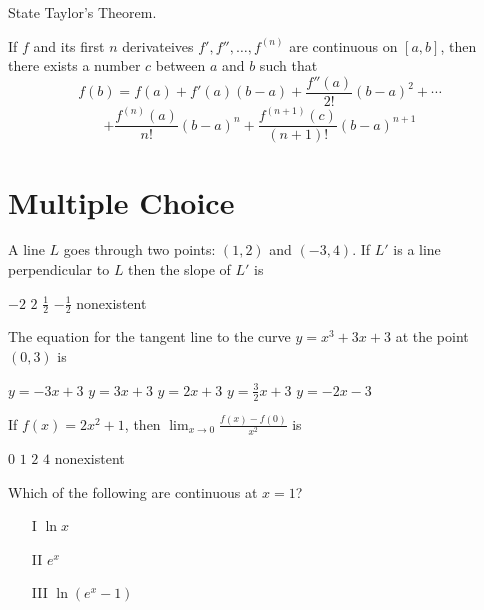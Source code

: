 \begin{questions}
    \question[1] State Taylor's Theorem.
    \begin{solution}
        If $f$ and its first $n$ derivateives $f', f'', \ldots,
        f^{(n)}$ are continuous on $[a, b]$, then there exists a number
        $c$ between $a$ and $b$ such that 
        $$f(b) = f(a) + f'(a)(b-a) + \frac{f''(a)}{2!}(b-a)^2
        + \cdots$$
        $$+ \frac{f^{(n)}(a)}{n!}(b-a)^n + \frac{f^{(n+1)}(c)}{(n+1)!}(b-a)^{n+        1}$$
    \end{solution}
\end{questions}

\section{Multiple Choice}
\begin{questions}       

\question[2] A line $L$ goes through two points: $(1, 2)$ and $(-3,
        4)$. If $L'$ is a line perpendicular to $L$ then the slope of
        $L'$ is
    
    \begin{oneparchoices}
    \choice $-2$
    \choice $2$
    \choice $\frac{1}{2}$
    \CorrectChoice $-\frac{1}{2}$
    \choice nonexistent
    \end{oneparchoices}

\question[2] The equation for the tangent line to the curve $y = x^3 +
    3x + 3$ at the point $(0, 3)$ is

    \begin{oneparchoices}
    \CorrectChoice $y = -3x + 3$
    \choice $y = 3x + 3$
    \choice $y = 2x + 3$
    \choice $y = \frac{3}{2}x + 3$
    \choice $y = -2x - 3$
    \end{oneparchoices}

\question[2] If $f(x) = 2x^2 + 1$, then $\lim_{x \to 0} \frac{f(x) -
    f(0)}{x^2}$ is
    
    \begin{oneparchoices}
    \choice $0$
    \choice $1$
    \CorrectChoice $2$
    \choice $4$
    \choice nonexistent
    \end{oneparchoices}

\question[2] Which of the following are continuous at $x = 1$?
    \begin{enumerate}
    \item[I] $\ln x$
    \item[II] $e^{x}$
    \item[III] $\ln(e^{x} - 1)$
    \end{enumerate}


\end{questions}
